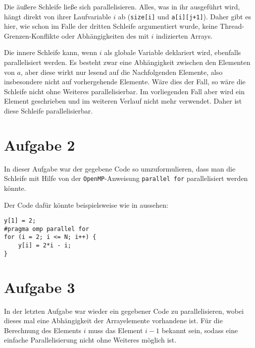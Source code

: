 Die äußere Schleife ließe sich parallelisieren. Alles, was in ihr ausgeführt wird,
hängt direkt von ihrer Laufvariable $i$ ab (\texttt{size[i]} und \texttt{a[i][j+1]}).
Daher gibt es hier, wie schon im Falle der dritten Schleife argumentiert wurde, keine
Thread-Grenzen-Konflikte oder Abhängigkeiten des mit $i$ indizierten Arrays.

Die innere Schleife kann, wenn $i$ als globale Variable deklariert wird, ebenfalls
parallelisiert werden. Es besteht zwar eine Abhängigkeit zwischen den Elementen
von $a$, aber diese wirkt nur lesend auf die Nachfolgenden Elemente, also insbesondere
nicht auf vorhergehende Elemente. Wäre dies der Fall, so wäre die Schleife nicht
ohne Weiteres parallelisierbar. Im vorliegenden Fall aber wird ein Element geschrieben
und im weiteren Verlauf nicht mehr verwendet. Daher ist diese Schleife parallelisierbar.

\section*{Aufgabe 2}

In dieser Aufgabe war der gegebene Code so umzuformulieren, dass man die Schleife
mit Hilfe von der \texttt{OpenMP}-Anweisung \texttt{parallel for} parallelisiert
werden könnte.

Der Code dafür könnte beispielsweise wie in  aussehen:

\begin{lstlisting}[caption=Parallelisierte Schleife,label=lst:code2]
y[1] = 2;
#pragma omp parallel for
for (i = 2; i <= N; i++) {
    y[i] = 2*i - i;
}
\end{lstlisting}

\section*{Aufgabe 3}

In der letzten Aufgabe war wieder ein gegebener Code zu parallelisieren, wobei dieses 
mal eine Abhängigkeit der Arrayelemente vorhandene ist. Für die Berechnung des Elements
$i$ muss das Element $i-1$ bekannt sein, sodass eine einfache Parallelisierung nicht
ohne Weiteres möglich ist.